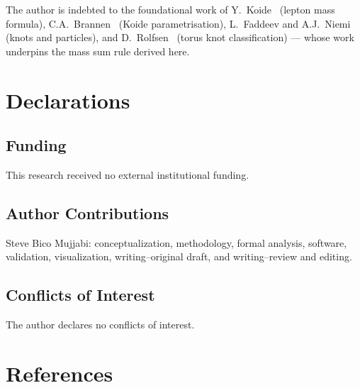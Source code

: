 \documentclass[11pt]{article}
\begin{document}
The author is indebted to the foundational work of
Y.~Koide~\cite{Koide1983} (lepton mass formula),
C.A.~Brannen~\cite{Brannen2006} (Koide parametrisation),
L.~Faddeev and A.J.~Niemi~\cite{FaddeevNiemi1997} (knots and particles),
and D.~Rolfsen~\cite{Rolfsen1976} (torus knot classification)
--- whose work underpins the mass sum rule derived here.

\section*{Declarations}

\subsection*{Funding}
This research received no external institutional funding.

\subsection*{Author Contributions}
Steve Bico Mujjabi: conceptualization, methodology, formal analysis, software,
validation, visualization, writing--original draft, and writing--review and
editing.

\subsection*{Conflicts of Interest}
The author declares no conflicts of interest.

\section*{References}


\end{document}

